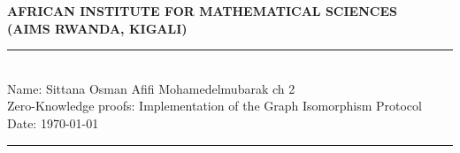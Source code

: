 \documentclass[12pt,a4paper]{article}
\begin{document}


\thispagestyle{empty}
\begin{center}
\textbf{AFRICAN INSTITUTE FOR MATHEMATICAL SCIENCES \\[0.5cm]
(AIMS RWANDA, KIGALI)}
\vspace{1.0cm}
\end{center}

\noindent
\rule{17cm}{0.2cm}\\[0.3cm]
Name: Sittana Osman Afifi Mohamedelmubarak \hfill  ch 2\\[0.1cm]
Zero-Knowledge proofs: Implementation of the Graph Isomorphism Protocol  \hfill Date: \today\\
\rule{17cm}{0.05cm}
\vspace{1.0cm}
\end{document}
